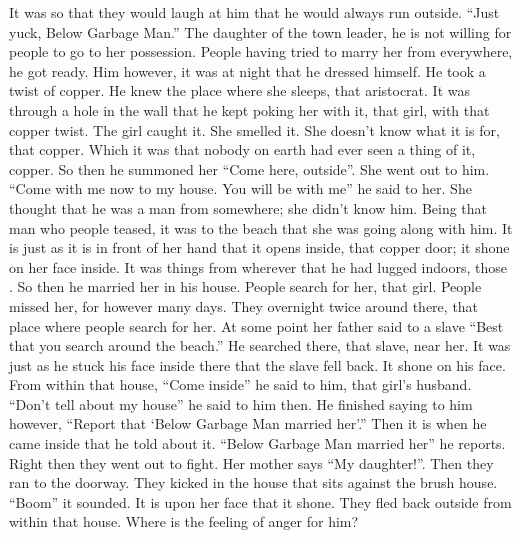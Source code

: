 \begin{pairs}
\begin{Rightside}
It was so that they would laugh at him that he would always run outside.
“Just yuck, Below Garbage Man.”
\pend
\pstart
{}The daughter of the town leader, he is not willing for people to go to her possession.
People having tried to marry her from everywhere, he got ready.
Him however, it was at night that he dressed himself.
He took a twist of copper.
He knew the place where she sleeps, that aristocrat.
It was through a hole in the wall that he kept poking her with it, that girl, with that copper twist.
The girl caught it.
She smelled it.
She doesn’t know what it is for, that copper.
Which it was that nobody on earth had ever seen a thing of it, copper.
So then he summoned her “Come here, outside”.
She went out to him.
\qqk{}“Come with me now to my house.
You will be with me”
he said to her.
She thought that he was a man from somewhere;
she didn’t know him.
Being that man who people teased, it was to the beach that she was going along with him.
It is just as it is in front of her hand that it opens inside, that copper door;
it shone on her face inside.
It was things from wherever that he had lugged indoors, those .
So then he married her in his house.
\pend
\pstart
{}People search for her, that girl.
People missed her, for however many days.
They overnight twice around there, that place where people search for her.
At some point her father said to a slave
“Best that you search around the beach.”
He searched there, that slave, near her.
It was just as he stuck his face inside there that the slave fell back.
It shone on his face.
From within that house, “Come inside” he said to him, that girl’s husband.
“Don’t tell about my house” he said to him then.
He finished saying to him however,
“Report that ‘Below Garbage Man married her’.”
Then it is when he came inside that he told about it.
“Below Garbage Man married her” he reports.
Right then they went out to fight.
Her mother says “My daughter!”.
Then they ran to the doorway.
They kicked in the house that sits against the brush house.
\qqk{}“Boom” it sounded.
It is upon her face that it shone.
They fled back outside from within that house.
Where is the feeling of anger for him?

\end{Rightside}
\end{pairs}

